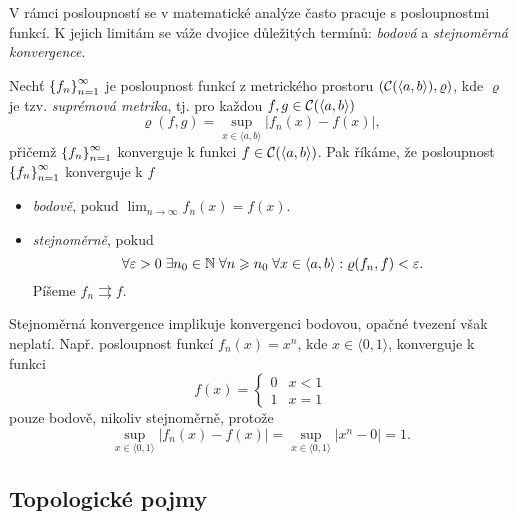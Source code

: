 V rámci posloupností se v matematické analýze často pracuje s posloupnostmi funkcí. K jejich limitám se váže dvojice důležitých termínů: \emph{bodová} a \emph{stejnoměrná konvergence}.
\begin{definition}\label{def:bodova-stejnomerna-konvergence}
    Nechť $\left\{f_n\right\}_{n=1}^\infty$ je posloupnost funkcí z metrického prostoru $(\mathcal{C}(\langle a,b\rangle),\varrho)$, kde $\varrho$ je tzv. \emph{suprémová metrika}, tj. pro každou $f,g\in \mathcal{C}(\langle a,b\rangle)$
    \[\varrho(f,g)=\sup_{x\in\langle a,b\rangle}|f_n(x)-f(x)|,\]
    přičemž $\left\{f_n\right\}_{n=1}^\infty$ konverguje k funkci $f\in \mathcal{C}(\langle a,b\rangle)$.
    Pak říkáme, že posloupnost $\left\{f_n\right\}_{n=1}^\infty$ konverguje k $f$
    \begin{itemize}
        \item \emph{bodově}, pokud $\lim_{n\to\infty}f_n(x)=f(x)$.
        \item \emph{stejnoměrně}, pokud
        \[\forall\varepsilon>0\;\exists n_0\in\mathbb{N}\;\forall n\geqslant n_0\;\forall x\in\langle a,b\rangle: \varrho(f_n,f)<\varepsilon.\]
        Píšeme $f_n\rightrightarrows f$.
    \end{itemize}
\end{definition}
Stejnoměrná konvergence implikuje konvergenci bodovou, opačné tvezení však neplatí. Např. posloupnost funkcí $f_n(x)=x^n$, kde $x\in\langle 0,1\rangle$, konverguje k funkci 
\[f(x)=\begin{cases}
    0 & x < 1\\
    1 & x = 1
\end{cases}\]
pouze bodově, nikoliv stejnoměrně, protože
\[\sup_{x\in\langle 0,1\rangle}|f_n(x)-f(x)|=\sup_{x\in\langle 0,1\rangle}|x^n-0|=1.\]

\subsection{Topologické pojmy}\label{subsec:topologicke-pojmy}

